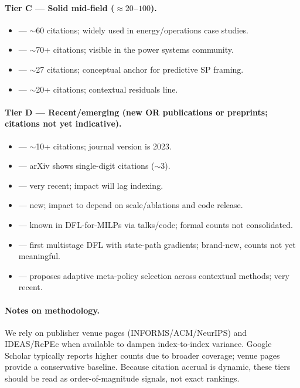 \documentclass[11pt]{article}
\begin{document}
\paragraph{Tier C --- Solid mid-field ($\approx 20$--$100$).}
\begin{itemize}
  \item \citet{munoz2022bilevel} --- $\sim$60 citations; widely used in energy/operations case studies.
  \item \citet{stratigakos2022prescriptive} --- $\sim$70+ citations; visible in the power systems community.
  \item \citet{deng2022predictive} --- $\sim$27 citations; conceptual anchor for predictive SP framing.
  \item \citet{kannan2021hetero} --- $\sim$20+ citations; contextual residuals line.
\end{itemize}

\paragraph{Tier D --- Recent/emerging (new OR publications or preprints; citations not yet indicative).}
\begin{itemize}
  \item \citet{estes2023twostage} --- $\sim$10+ citations; journal version is 2023.
  \item \citet{zhu2024residualcdro} --- arXiv shows single-digit citations ($\sim$3).
  \item \citet{diasgarcia2024application} --- very recent; impact will lag indexing.
  \item \citet{islip2025contextual} --- new; impact to depend on scale/ablations and code release.
  \item \citet{wu2022cvae} --- known in DFL-for-MILPs via talks/code; formal counts not consolidated.
  \item \citet{persak2024dff} --- first multistage DFL with state-path gradients; brand-new, counts not yet meaningful.
  \item \citet{iglesias2025prescribeselect} --- proposes adaptive meta-policy selection across contextual methods; very recent.
\end{itemize}

\paragraph{Notes on methodology.} We rely on publisher venue pages (INFORMS/ACM/NeurIPS) and IDEAS/RePEc when available to dampen index-to-index variance. Google Scholar typically reports higher counts due to broader coverage; venue pages provide a conservative baseline. Because citation accrual is dynamic, these tiers should be read as order-of-magnitude signals, not exact rankings.
\end{document}
